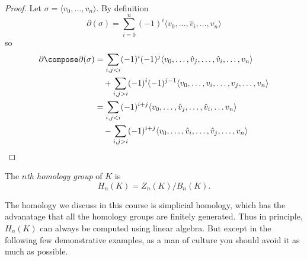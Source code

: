 \documentclass[a4paper]{article}
\renewcommand{\b}{\partial} %
\begin{document}
\begin{proof}
  Let \(\sigma = \langle v_0, \dots, v_n \rangle\). By definition
  \[
    \b(\sigma) = \sum_{i = 0}^n (-1)^i \langle v_0, \dots, \hat v_i, \dots, v_n \rangle
  \]
  so
  \begin{align*}
    \b \compose \b(\sigma)
    &= \sum_{i, j < i} (-1)^i (-1)^j \langle v_0, \dots, \hat v_j, \dots, \hat v_i, \dots, v_n \rangle \\
    &\quad+ \sum_{i, j > i} (-1)^i (-1)^{j - 1} \langle v_0, \dots, v_i, \dots, v_j, \dots, v_n \rangle \\
    &= \sum_{i, j < i} (-1)^{i + j} \langle v_0, \dots, \hat v_j, \dots, \hat v_i, \dots v_n \rangle \\
    &\quad- \sum_{i, j > i} (-1)^{i + j} \langle v_0, \dots, \hat v_i, \dots, \hat v_j, \dots, v_n \rangle
  \end{align*}
\end{proof}

\begin{definition}
  The \emph{\(n\)th homology group} of \(K\) is
  \[
    H_n(K) = Z_n(K) / B_n(K).
  \]
\end{definition}

\begin{remark}
  The homology we discuss in this course is simplicial homology, which has the advanatage that all the homology groups are finitely generated. Thus in principle, \(H_n(K)\) can always be computed using linear algebra. But except in the following few demonstrative examples, as a man of culture you should avoid it as much as possible.
\end{remark}
\end{document}
